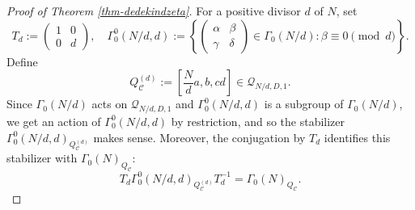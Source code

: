 \documentclass[12pt]{amsart}
\numberwithin{equation}{section}
\theoremstyle{definition}
\begin{document}
\begin{proof}[Proof of Theorem \ref{thm-dedekindzeta}]
For a positive divisor $d$ of $N$, set
$$T_{d}:=\left(\begin{smallmatrix}
    1 & 0 \\ 0 & d
\end{smallmatrix}\right),\quad\Gamma_{0}^{0}(N/d,d):=\left\{\left(\begin{smallmatrix}
    \alpha & \beta \\ \gamma & \delta
\end{smallmatrix}\right)\in\Gamma_{0}(N/d):\beta\equiv 0\pmod{d}\right\}.$$
Define
$$Q_{\mathcal{C}}^{(d)}:=\left[\frac{N}{d}a,b,cd\right]\in\mathcal{Q}_{N/d,D,1}.$$
Since $\Gamma_{0}(N/d)$ acts on $\mathcal{Q}_{N/d,D,1}$ and $\Gamma_{0}^{0}(N/d,d)$ is a subgroup of $\Gamma_{0}(N/d)$, we get an action of $\Gamma_{0}^{0}(N/d,d)$ by restriction, and so the stabilizer $\Gamma_{0}^{0}(N/d,d)_{Q_{\mathcal{C}}^{(d)}}$ makes sense. Moreover, the conjugation by $T_{d}$ identifies this stabilizer with $\Gamma_{0}(N)_{Q_{\mathcal{C}}}$:
$$T_{d}\Gamma_{0}^{0}(N/d,d)_{Q_{\mathcal{C}}^{(d)}}T_{d}^{-1}=\Gamma_{0}(N)_{Q_{\mathcal{C}}}.$$


\end{proof}
\end{document}

